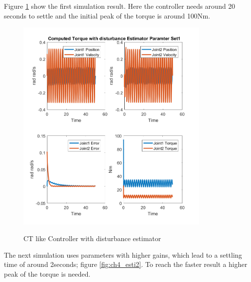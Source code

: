 Figure \ref{fig:ch4_esti1} show the first simulation result. Here the controller needs around 20 seconds to settle and the initial peak of the torque is around 100Nm.\\
\begin{figure}[]
	\centering
	\includegraphics[width=0.85\textwidth]{pics/ComputedTorquewithdisturbanceEstimatorParamterSet1.png}\\
	\caption{CT like Controller with disturbance estimator}
	\label{fig:ch4_esti1}
\end{figure}
The next simulation uses parameters with higher gains, which lead to a settling time of around 2seconds; figure \ref{fig:ch4_esti2}. To reach the faster result a higher peak of the torque is needed.
